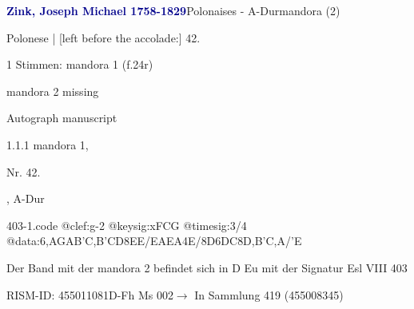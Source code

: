 \documentclass[twocolumn, 12pt]{book}
\begin{document}
\par \vspace{16pt} \textcolor{darkblue}{\textbf{Zink, Joseph Michael  1758-1829}}\hfillplus{\textbf{[403]}}\newline Polonaises - A-Dur\newline mandora (2)
\par \begin{itshape}[f.24v, at left:] Polonese | [left before the accolade:] 42.\end{itshape} 
\par \textcolor{darkblue}{}  1 Stimmen: mandora 1  (f.24r)\newline \begin{small} mandora 2 missing\end{small} \newline Autograph manuscript
\par 1.1.1  mandora 1, \begin{itshape}Nr. 42.\end{itshape}, A-Dur  
\begin{filecontents*}{403-1.code}
@clef:g-2
@keysig:xFCG
@timesig:3/4
@data:{6,AGAB}{'C,B}{'CD}{8EE}/EAEA4E/{8D6DC}8D,B'C,A/'E
\end{filecontents*}
\newline %
\par Der Band mit der mandora 2 befindet sich in D Eu mit der Signatur Esl VIII 403
\par RISM-ID: 455011081\newline D-Fh  Ms 002\newline $\rightarrow$ In Sammlung 419 (455008345)
      
\end{document}
